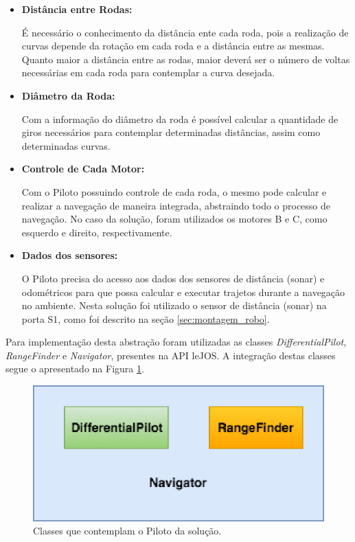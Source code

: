	\begin{itemize}
		\item \textbf{Distância entre Rodas:}

			É necessário o conhecimento da distância ente cada roda, pois a realização de curvas depende da rotação em cada roda e a distância entre
			as mesmas. Quanto maior a distância entre as rodas, maior deverá ser o número de voltas necessárias em cada roda para contemplar a curva desejada.

			\item \textbf{Diâmetro da Roda:}

			Com a informação do diâmetro da roda é possível calcular a quantidade de giros necessários para contemplar determinadas distâncias, assim
			como determinadas curvas.

			\item \textbf{Controle de Cada Motor:}

			Com o Piloto possuindo controle de cada roda, o mesmo pode calcular e realizar a navegação de maneira integrada, abstraindo todo o
			processo de navegação. No caso da solução, foram utilizados os motores B e C, como esquerdo e direito, respectivamente.

			\item \textbf{Dados dos sensores:}

			O Piloto precisa do acesso aos dados dos sensores de distância (sonar) e odométricos para que possa calcular e executar trajetos
			durante a navegação no ambiente. Nesta solução foi utilizado o sensor de distância (sonar) na porta S1, como foi descrito na seção \ref{sec:montagem_robo}.

	\end{itemize}

	Para implementação desta abstração foram utilizadas as classes \textit{DifferentialPilot}, \textit{RangeFinder} e \textit{Navigator},
	presentes na API leJOS. A integração destas classes segue o apresentado na Figura \ref{img:classes_navegacao}.

	\begin{figure}[H]
		\centering
		\includegraphics[scale=0.8]{figuras/classes_nav.eps}
		\caption[Classes Piloto]{Classes que contemplam o Piloto da solução.}
		\label{img:classes_navegacao}
	\end{figure}

